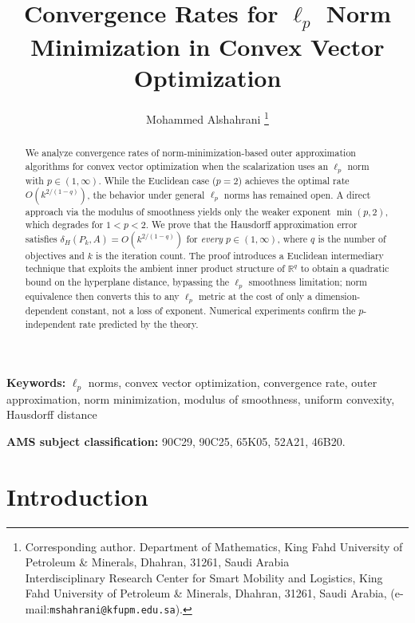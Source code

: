 \documentclass[11pt]{article}
\newcommand{\R}{\mathbb{R}}
\begin{document}
\title{Convergence Rates for $\ell_p$ Norm Minimization in Convex Vector Optimization}

\author{
Mohammed Alshahrani \thanks{Corresponding author. Department of Mathematics, King Fahd University of Petroleum \& Minerals, Dhahran, 31261, Saudi Arabia\\
Interdisciplinary Research Center for Smart Mobility and Logistics, King Fahd University of Petroleum \& Minerals, Dhahran, 31261, Saudi Arabia, (e-mail:{\tt mshahrani@kfupm.edu.sa}).}
}

\maketitle

\begin{abstract}
We analyze convergence rates of norm-minimization-based outer approximation algorithms for convex vector optimization when the scalarization uses an $\ell_p$ norm with $p \in (1,\infty)$. While the Euclidean case ($p=2$) achieves the optimal rate $O(k^{2/(1-q)})$, the behavior under general $\ell_p$ norms has remained open. A direct approach via the modulus of smoothness yields only the weaker exponent $\min(p,2)$, which degrades for $1 < p < 2$. We prove that the Hausdorff approximation error satisfies $\delta_H(P_k, A) = O(k^{2/(1-q)})$ for \emph{every} $p \in (1,\infty)$, where $q$ is the number of objectives and $k$ is the iteration count. The proof introduces a Euclidean intermediary technique that exploits the ambient inner product structure of $\R^q$ to obtain a quadratic bound on the hyperplane distance, bypassing the $\ell_p$ smoothness limitation; norm equivalence then converts this to any $\ell_p$ metric at the cost of only a dimension-dependent constant, not a loss of exponent. Numerical experiments confirm the $p$-independent rate predicted by the theory.
\end{abstract}

\noindent
\textbf{Keywords:} $\ell_p$ norms, convex vector optimization, convergence rate, outer approximation, norm minimization, modulus of smoothness, uniform convexity, Hausdorff distance\\

\medskip

\noindent
\textbf{AMS subject classification:} 90C29, 90C25, 65K05, 52A21, 46B20.

\section{Introduction}\label{sec:intro}
\end{document}

